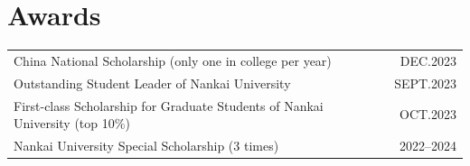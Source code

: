 \documentclass[a4paper,10pt]{article}
\newcommand{\faTrophy}{}
\begin{document}
\section{\texorpdfstring{\faTrophy\hspace{6pt}}{}Awards}

\begin{tabularx}{\textwidth}{@{}Xr@{}}
  China National Scholarship (only one in college per year) & DEC.2023 \\
  Outstanding Student Leader of Nankai University & SEPT.2023 \\
  First-class Scholarship for Graduate Students of Nankai University (top 10\%) & OCT.2023 \\
  Nankai University Special Scholarship (3 times) & 2022--2024 \\
\end{tabularx}
\end{document}
